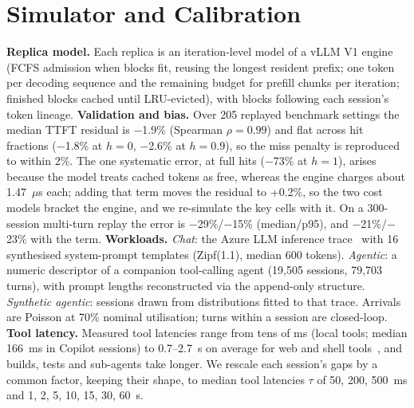 \documentclass[conference]{IEEEtran}
\begin{document}
\section{Simulator and Calibration}
\label{sec:sim}

\textbf{Replica model.} Each replica is an iteration-level model of a vLLM V1 engine (FCFS admission when blocks fit, reusing the longest resident prefix; one token per decoding sequence and the remaining budget for prefill chunks per iteration; finished blocks cached until LRU-evicted), with blocks following each session's token lineage. \textbf{Validation and bias.} Over 205 replayed benchmark settings the median TTFT residual is $-$1.9\% (Spearman $\rho=0.99$) and flat across hit fractions ($-$1.8\% at $h=0$, $-$2.6\% at $h=0.9$), so the miss penalty is reproduced to within 2\%. The one systematic error, at full hits ($-$73\% at $h=1$), arises because the model treats cached tokens as free, whereas the engine charges about 1.47~$\mu$s each; adding that term moves the residual to +0.2\%, so the two cost models bracket the engine, and we re-simulate the key cells with it. On a 300-session multi-turn replay the error is $-$29\%/$-$15\% (median/p95), and $-$21\%/$-$23\% with the term. \textbf{Workloads.} \emph{Chat}: the Azure LLM inference trace~\cite{r24,r25} with 16 synthesised system-prompt templates (Zipf(1.1), median 600 tokens). \emph{Agentic}: a numeric descriptor of a companion tool-calling agent (19,505 sessions, 79,703 turns), with prompt lengths reconstructed via the append-only structure. \emph{Synthetic agentic}: sessions drawn from distributions fitted to that trace. Arrivals are Poisson at 70\% nominal utilisation; turns within a session are closed-loop. \textbf{Tool latency.} Measured tool latencies range from tens of ms (local tools; median 166~ms in Copilot sessions) to 0.7--2.7~s on average for web and shell tools~\cite{r16,r19,r20,r26,r27,r28,r29}, and builds, tests and sub-agents take longer. We rescale each session's gaps by a common factor, keeping their shape, to median tool latencies $\tau$ of 50, 200, 500~ms and 1, 2, 5, 10, 15, 30, 60~s.
\end{document}
